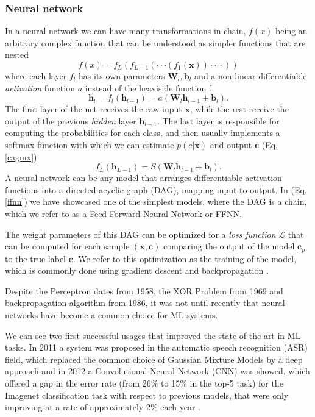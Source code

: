 \documentclass[11pt,english,listoffigures,listoftables]{tfgetsinf}
\newcommand{\vect}[1]{\mathbf{#1}}
\begin{document}
\subsubsection{Neural network}
In a neural network we can have many transformations in chain, $f(x)$ being an arbitrary complex function that can be understood as simpler functions that are nested
\begin{equation}\label{ffnn}
    f(x) = f_L(f_{L-1}(\cdot\cdot\cdot (f_1(\vect{x}))\cdot\cdot \ \cdot))
\end{equation}
where each layer $f_l$ has its own parameters $\vect{W}_l, \vect{b}_l$ and a non-linear differentiable \textit{activation} function $a$ instead of the heaviside function $\mathbb{I}$
\begin{equation}
    \vect{h}_l = f_l(\vect{h}_{l-1}) = a(\vect{W}_l\vect{h}_{l-1} + \vect{b}_l). 
\end{equation}
The first layer of the net receives the raw input $\vect{x}$, while the rest receive the output of the previous \textit{hidden} layer $\vect{h}_{l-1}$.
The last layer is responsible for computing the probabilities for each class, and then usually implements a softmax function with which we can estimate $p(c|\vect{x})$ and output $\vect{c}$ (Eq. \ref{cagmx})
\begin{equation}
    f_L(\vect{h}_{L-1}) = S(\vect{W}_l\vect{h}_{l-1} + \vect{b}_l).
\end{equation}
A neural network can be any model that arranges differentiable activation functions into a directed acyclic graph (DAG), mapping input to output. In (Eq. \ref{ffnn}) we have showcased one of the simplest models, where the DAG is a chain, which we refer to as a Feed Forward Neural Network or FFNN. 


The weight parameters of this DAG can be optimized for a \textit{loss function} $\mathcal{L}$ that can be computed for each sample $(\vect{x}, \vect{c})$ comparing the output of the model $\vect{c}_p$ to the true label $\vect{c}$.
We refer to this optimization as the training of the model, which is commonly done using gradient descent and backpropagation \cite{rumelhart1986learning}.

Despite the Perceptron dates from 1958, the XOR Problem from 1969 and backpropagation algorithm from 1986, it was not until recently that neural networks have become a common choice for ML systems.

We can see two first successful usages that improved the state of the art in ML tasks. In 2011 a system was proposed in the automatic speech recognition (ASR) field, which replaced the common choice of Gaussian Mixture Models by a deep approach \cite{dahl2011large} and in 2012 a Convolutional Neural Network (CNN) was showed, which offered a gap in the error rate (from 26\% to 15\% in the top-5 task) for the Imagenet classification task with respect to previous models, that were only improving at a rate of approximately 2\% each year \cite{10.5555/2999134.2999257}.
\end{document}

